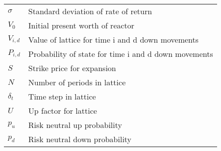 \begin{tabular}{ l l }
$\sigma$	&	Standard deviation of rate of return  \\
$V_0$	&	 Initial present worth of reactor   \\
$V_{i,d}$ &	Value of lattice for time i and d down movements  \\
$P_{i,d}$ &	Probability of state for time i and d down movements   \\
$S$	&	 Strike price for expansion   \\
$N$	&	 Number of periods in lattice  \\
$\delta_t$	&	 Time step in lattice   \\
$U$ 	&	 Up factor for lattice   \\
$p_u$  &	 Risk neutral up probability   \\
$p_d $  &	 Risk neutral down probability   
\end{tabular}